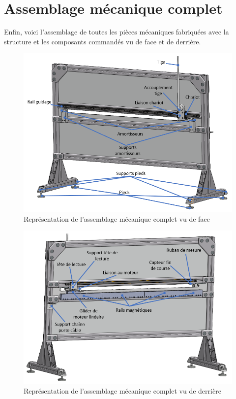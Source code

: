 \section{Assemblage mécanique complet}\label{sec:AssMecComp}
Enfin, voici l'assemblage de toutes les pièces mécaniques fabriquées avec la structure et les composants commandés vu de face et de derrière.

\begin{figure}[H]
  \centering
  \includegraphics[width = \textwidth]{assets/figures/AssemblageCompletFace.png}
  \caption{Représentation de l'assemblage mécanique complet vu de face}
  \label{fig:AssCompFace}
\end{figure}

\begin{figure}[H]
  \centering
  \includegraphics[width = \textwidth]{assets/figures/AssemblageCompletDerriere.png}
  \caption{Représentation de l'assemblage mécanique complet vu de derrière}
  \label{fig:AssCompDerriere}
\end{figure}
